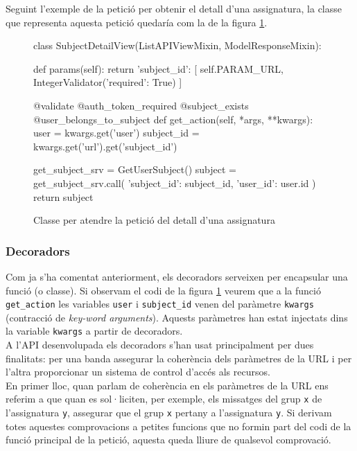Seguint l'exemple de la petició per obtenir el detall d'una assignatura,  la classe que representa aquesta petició quedaría com la de la figura \ref{fig:subject_detail_class}.

\begin{figure}[h!]
	\begin{python}
class SubjectDetailView(ListAPIViewMixin, ModelResponseMixin):

	def params(self):
		return {
			'subject_id': [
				self.PARAM_URL, 
				IntegerValidator({'required': True})
			]
		}
		
	@validate
	@auth_token_required
	@subject_exists
	@user_belongs_to_subject
	def get_action(self, *args, **kwargs):
		user = kwargs.get('user')
		subject_id = kwargs.get('url').get('subject_id')
		
		get_subject_srv = GetUserSubject()
		subject = get_subject_srv.call({
			'subject_id': subject_id, 
			'user_id': user.id
		})
		return subject
	\end{python}
	\caption{Classe per atendre la petició del detall d'una assignatura}
	\label{fig:subject_detail_class}
\end{figure}

\subsubsection{Decoradors}

Com ja s'ha comentat anteriorment, els decoradors serveixen per encapsular una funció (o classe). Si observam el codi de la figura \ref{fig:subject_detail_class} veurem que a la funció \texttt{get\_action} les variables \texttt{user} i \texttt{subject\_id} venen del paràmetre \texttt{kwargs} (contracció de \emph{key-word arguments}). Aquests paràmetres han estat injectats dins la variable \texttt{kwargs} a partir de decoradors.\\

A l'\ac{API} desenvolupada els decoradors s'han usat principalment per dues finalitats: per una banda assegurar la coherència dels paràmetres de la \ac{URL} i per l'altra proporcionar un sistema de control d'accés als recursos. \\

En primer lloc, quan parlam de coherència en els paràmetres de la \ac{URL} ens referim a que quan es sol·liciten, per exemple,  els missatges del grup \texttt{x} de l'assignatura \texttt{y}, assegurar que el grup \texttt{x} pertany a l'assignatura \texttt{y}. Si derivam totes aquestes comprovacions a petites funcions que no formin part del codi de la funció principal de la petició, aquesta queda lliure de qualsevol comprovació.\\

